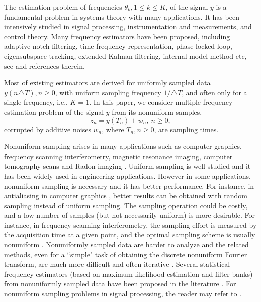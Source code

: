 \documentclass{UCF_ETD}
\begin{document}
The estimation problem  of
frequencies $\theta_k, 1\le k\le K$, of the signal $y$
is a fundamental problem in systems theory with many  applications.
It has been  intensively studied in  signal processing, instrumentation and measurements, and control theory.
Many frequency estimators have been proposed, including adaptive notch filtering, time frequency representation, phase locked loop, eigensubspace tracking, extended Kalman filtering, internal model method etc, see  \cite{%
Hsieh93, Badeau06, zhangbrown06, karimi11} and references therein.


Most of existing estimators are derived for uniformly sampled  data
$y(n\triangle T), n\ge 0$, with uniform sampling frequency $1/\triangle T$,
and often only for a single  %
frequency, i.e., $K=1$.
In this paper, we consider
multiple frequency estimation problem
of the signal $y$ %
from its
nonuniform samples,
\begin{equation}\label{multiSinusoids2}
z_n = y(T_n)+ w_n, \ n\ge 0,
\end{equation}
corrupted by  additive noises $w_n$,
where $T_n, n\ge 0$, are  sampling times.

Nonuniform sampling  arises in many  applications such as computer graphics, frequency scanning interferometry,
magnetic resonance imaging, %
computer tomography  %
scans and Radon imaging
 \cite{dutt93, stoica97,stoica00,  Marvasti01, Frida07, Maciejewski09}. 
Uniform sampling is well studied and it has been widely used in engineering applications. However in some applications,  
  nonuniform sampling is necessary and  it has better performance.  For instance, in antialiasing in computer graphics \cite{Cook1986}, better results can be obtained with random sampling instead of uniform sampling. The sampling operation  could be costly, and a low number of samples (but not necessarily uniform) is more desirable. For instance, in frequency scanning interferometry,  the sampling effort is measured by the acquisition time at a given point, and the optimal sampling scheme is  usually nonuniform \cite{Stefan2009}.
  Nonuniformly sampled data are harder to analyze and the related methods, even for a ``simple" task of obtaining the
  discrete nonuniform Fourier transform,
  are much more difficult and often iterative \cite{dutt93, %
  holland09}.
   Several statistical frequency estimators (based on maximum likelihood estimation and filter banks) from nonuniformly sampled data
   have been proposed in  the literature \cite{stoica00, %
    Gansman, Yonina00,Johansson02,Ryan04, tarcznski04, Dongdong}.
For  nonuniform sampling problems in signal processing, the reader may refer to \cite{unserieee,  akramsiam,  sunsiam}.  %
\end{document}
